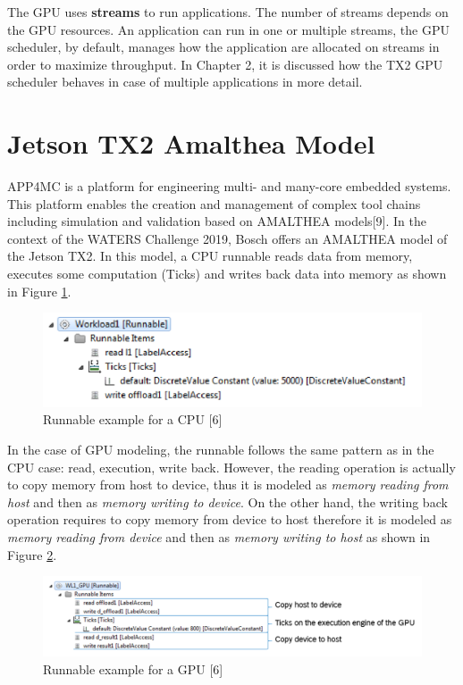 \documentclass[
  12pt,
  a4paperpaper,
]{report}
\begin{document}
The GPU uses \textbf{streams} to run applications. The number of streams
depends on the GPU resources. An application can run in one or multiple
streams, the GPU scheduler, by default, manages how the application 
are allocated on streams in order to maximize throughput. In Chapter 2,
it is discussed how the TX2 GPU scheduler behaves in case
of multiple applications in more detail.

\hypertarget{jetson-tx2-amalthea-model}{%
\section{Jetson TX2 Amalthea Model}\label{jetson-tx2-amalthea-model}}

APP4MC is a platform for engineering multi- and many-core embedded
systems. This platform enables the creation and management of complex
tool chains including simulation and validation based on AMALTHEA models{[}9{]}.
In the context of the WATERS Challenge 2019, Bosch offers an AMALTHEA model of the Jetson TX2.
In this model, a CPU runnable reads data from memory, executes some computation (Ticks) and writes back data into memory as shown in Figure \ref{img:amalthea01}.

\begin{figure}
\centering
\includegraphics{source/figures/amalthea-01.png}
\caption{Runnable example for a CPU {[}6{]} \label{img:amalthea01}}
\end{figure}

In the case of GPU modeling, the runnable follows the same pattern
as in the CPU case: read, execution, write back. However, the reading
operation is actually to copy memory from host to device, thus it is
modeled as \emph{memory reading from host} and then as \emph{memory
writing to device}. On the other hand, the writing back operation
requires to copy memory from device to host therefore it is modeled as
\emph{memory reading from device} and then as \emph{memory writing to
host} as shown in Figure \ref{img:amalthea02}.

\begin{figure}
\centering
\includegraphics{source/figures/amalthea-02.png}
\caption{Runnable example for a GPU {[}6{]} \label{img:amalthea02}}
\end{figure}
\end{document}
